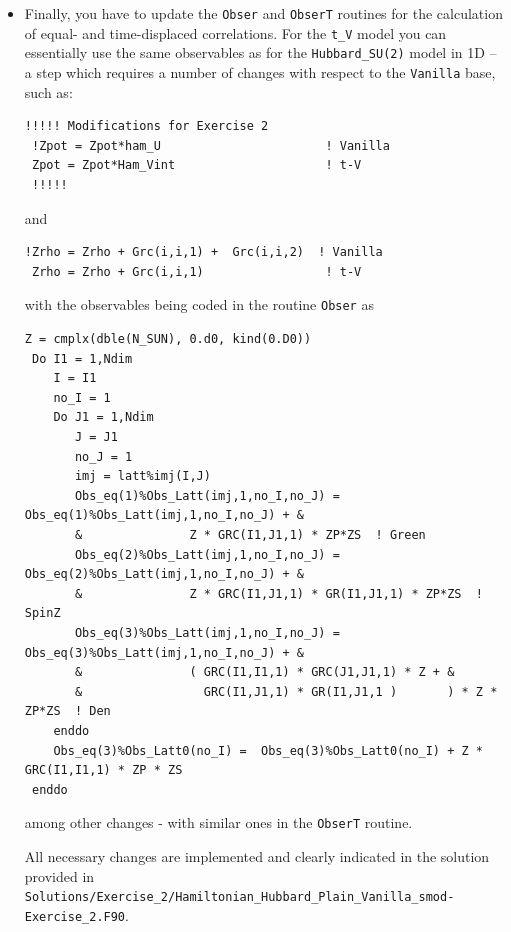 \documentclass[10pt,modern]{scrartcl}
\numberwithin{exerciseitem}{exercise} %
\begin{document}
\begin{itemize}
 
\begin{lstlisting}[style=fortran]
Allocate(Op_V(Ndim,N_FL))
 do nf = 1,N_FL
    do i  =  1, Ndim
       call Op_make(Op_V(i,nf),2)
    enddo
 enddo
 Do i = 1, Ndim  ! Runs over bonds = # of lattice sites in one-dimension. 
    i2                = Latt%nnlist(i,1,0)
    Op_V(i,nf)%P(1)   = i
    Op_V(i,nf)%P(2)   = i2
    Op_V(i,nf)%O(1,2) = cmplx(1.d0 ,0.d0, kind(0.d0))
    Op_V(i,nf)%O(2,1) = cmplx(1.d0 ,0.d0, kind(0.d0)) 
    Op_V(i,nf)%g      = sqrt(cmplx(Dtau*Ham_Vint/2.d0, 0.d0, kind(0.d0)))  
    Op_V(i,nf)%alpha  = cmplx(0d0  ,0.d0, kind(0.d0))
    Op_V(i,nf)%type   = 2
    Call Op_set( Op_V(i,nf) )
 enddo
\end{lstlisting}
\item  Finally, you have to update the \texttt{Obser} and \texttt{ObserT} routines for the calculation of equal- and time-displaced correlations. For the \texttt{t\_V} model you can essentially use the same observables as for the \texttt{Hubbard\_SU(2)} model in 1D -- a step which requires a number of changes with respect to the \texttt{Vanilla} base, such as:
\begin{lstlisting}[style=fortran]
!!!!! Modifications for Exercise 2
 !Zpot = Zpot*ham_U                       ! Vanilla
 Zpot = Zpot*Ham_Vint                     ! t-V
 !!!!!
\end{lstlisting}
and
\begin{lstlisting}[style=fortran]
!Zrho = Zrho + Grc(i,i,1) +  Grc(i,i,2)  ! Vanilla
 Zrho = Zrho + Grc(i,i,1)                 ! t-V
\end{lstlisting}
with the observables being coded in the routine \texttt{Obser} as
\begin{lstlisting}[style=fortran]
Z = cmplx(dble(N_SUN), 0.d0, kind(0.D0))
 Do I1 = 1,Ndim
    I = I1
    no_I = 1
    Do J1 = 1,Ndim
       J = J1
       no_J = 1
       imj = latt%imj(I,J)
       Obs_eq(1)%Obs_Latt(imj,1,no_I,no_J) =  Obs_eq(1)%Obs_Latt(imj,1,no_I,no_J) + &
       &               Z * GRC(I1,J1,1) * ZP*ZS  ! Green
       Obs_eq(2)%Obs_Latt(imj,1,no_I,no_J) =  Obs_eq(2)%Obs_Latt(imj,1,no_I,no_J) + &
       &               Z * GRC(I1,J1,1) * GR(I1,J1,1) * ZP*ZS  ! SpinZ
       Obs_eq(3)%Obs_Latt(imj,1,no_I,no_J) =  Obs_eq(3)%Obs_Latt(imj,1,no_I,no_J) + &
       &               ( GRC(I1,I1,1) * GRC(J1,J1,1) * Z + &
       &                 GRC(I1,J1,1) * GR(I1,J1,1 )       ) * Z * ZP*ZS  ! Den
    enddo
    Obs_eq(3)%Obs_Latt0(no_I) =  Obs_eq(3)%Obs_Latt0(no_I) + Z * GRC(I1,I1,1) * ZP * ZS
 enddo
\end{lstlisting}
among other changes - with similar ones in the \texttt{ObserT} routine.

All necessary changes are implemented and clearly indicated in the solution provided in \texttt{Solutions/Exercise\_2/Hamiltonian\_Hubbard\_Plain\_Vanilla\_smod-Exercise\_2.F90}.
\end{itemize}
\end{document}
